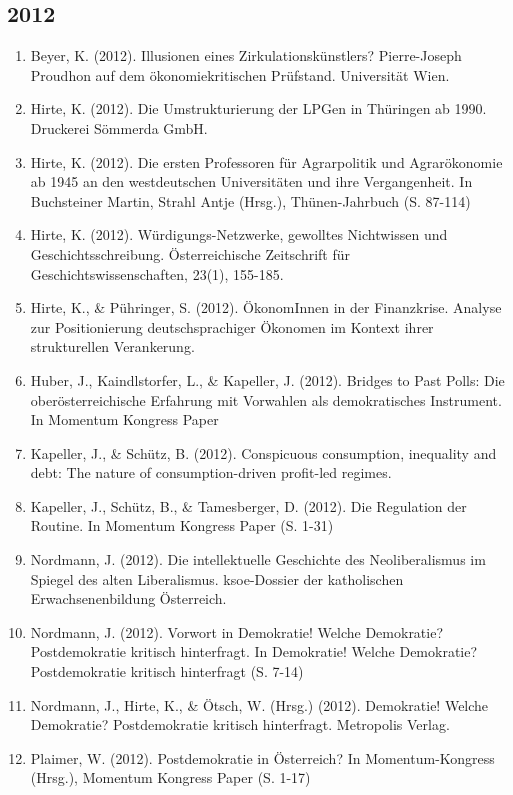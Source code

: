 \subsection*{2012}
\begin{enumerate}
	 \item Beyer, K. (2012). Illusionen eines Zirkulationskünstlers? Pierre-Joseph Proudhon auf dem ökonomiekritischen Prüfstand. Universität Wien.
	 \item Hirte, K. (2012). Die Umstrukturierung der LPGen in Thüringen ab 1990. Druckerei Sömmerda GmbH.
	 \item Hirte, K. (2012). Die ersten Professoren für Agrarpolitik und Agrarökonomie ab 1945 an den westdeutschen Universitäten und ihre Vergangenheit. In Buchsteiner Martin, Strahl Antje (Hrsg.), Thünen-Jahrbuch (S. 87-114)
	 \item Hirte, K. (2012). Würdigungs-Netzwerke, gewolltes Nichtwissen und Geschichtsschreibung. Österreichische Zeitschrift für Geschichtswissenschaften, 23(1), 155-185.
	 \item Hirte, K., \& Pühringer, S. (2012). ÖkonomInnen in der Finanzkrise. Analyse zur Positionierung deutschsprachiger Ökonomen im Kontext ihrer strukturellen Verankerung.
	 \item Huber, J., Kaindlstorfer, L., \& Kapeller, J. (2012). Bridges to Past Polls: Die oberösterreichische Erfahrung mit Vorwahlen als demokratisches Instrument. In Momentum Kongress Paper
	 \item Kapeller, J., \& Schütz, B. (2012). Conspicuous consumption, inequality and debt: The nature of consumption-driven profit-led regimes.
	 \item Kapeller, J., Schütz, B., \& Tamesberger, D. (2012). Die Regulation der Routine. In Momentum Kongress Paper (S. 1-31)
	 \item Nordmann, J. (2012). Die intellektuelle Geschichte des Neoliberalismus im Spiegel des alten Liberalismus. ksoe-Dossier der katholischen Erwachsenenbildung Österreich.
	 \item Nordmann, J. (2012). Vorwort in \glqq Demokratie! Welche Demokratie? Postdemokratie kritisch hinterfragt\grqq{}. In Demokratie! Welche Demokratie? Postdemokratie kritisch hinterfragt (S. 7-14)
	 \item Nordmann, J., Hirte, K., \& Ötsch, W. (Hrsg.) (2012). Demokratie! Welche Demokratie? Postdemokratie kritisch hinterfragt. Metropolis Verlag.
	 \item Plaimer, W. (2012). Postdemokratie in Österreich? In Momentum-Kongress (Hrsg.), Momentum Kongress Paper (S. 1-17)

\end{enumerate}
